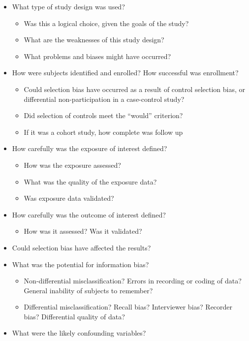 \documentclass[]{book}
\providecommand{\tightlist}{%
  \setlength{\itemsep}{0pt}\setlength{\parskip}{0pt}}
\begin{document}
\begin{itemize}
\tightlist
\item
  What type of study design was used?

  \begin{itemize}
  \tightlist
  \item
    Was this a logical choice, given the goals of the study?
  \item
    What are the weaknesses of this study design?
  \item
    What problems and biases might have occurred?
  \end{itemize}
\item
  How were subjects identified and enrolled? How successful was enrollment?

  \begin{itemize}
  \tightlist
  \item
    Could selection bias have occurred as a result of control selection bias, or differential non-participation in a case-control study?
  \item
    Did selection of controls meet the ``would'' criterion?
  \item
    If it was a cohort study, how complete was follow up
  \end{itemize}
\item
  How carefully was the exposure of interest defined?

  \begin{itemize}
  \tightlist
  \item
    How was the exposure assessed?
  \item
    What was the quality of the exposure data?
  \item
    Was exposure data validated?
  \end{itemize}
\item
  How carefully was the outcome of interest defined?

  \begin{itemize}
  \tightlist
  \item
    How was it assessed? Was it validated?
  \end{itemize}
\item
  Could selection bias have affected the results?
\item
  What was the potential for information bias?

  \begin{itemize}
  \tightlist
  \item
    Non-differential misclassification? Errors in recording or coding of data? General inability of subjects to remember?
  \item
    Differential misclassification? Recall bias? Interviewer bias? Recorder bias? Differential quality of data?
  \end{itemize}
\item
  What were the likely confounding variables?


\end{itemize}
\end{document}
